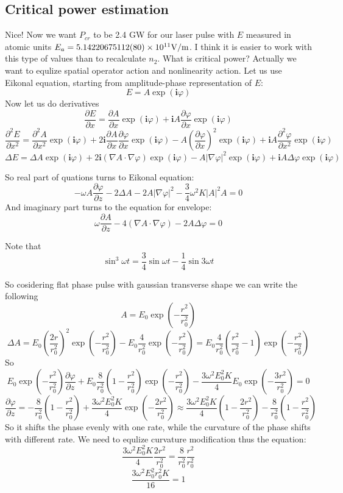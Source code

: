 \documentclass{article}
\newcommand{\dd}{\partial}
\newcommand{\ff}{\frac}
\newcommand{\ci}{\mathbf{i}}
\begin{document}
\subsection{Critical power estimation}
Nice! Now we want $P_{cr}$ to be 2.4 GW for our laser pulse with $E$ measured in atomic units $E_a = 5.14220675112(80) \times 10^{11} \text V / \text m$. I think it is easier to work with this type of values than to recalculate $n_2$.
What is critical power? Actually we want to equlize spatial operator action and nonlinearity action.
Let us use Eikonal equation, starting from amplitude-phase representation of $E$:
\[ E = A \exp (\ci \varphi) \]
Now let us do derivatives
\[ \ff{\dd E} {\dd x} = \ff{\dd A}{\dd x} \exp (\ci \varphi) + \ci A \ff{\dd \varphi}{\dd x} \exp (\ci \varphi) \]
\[ \ff{\dd^2 E} {\dd x^2} = \ff{\dd^2 A}{\dd x^2} \exp (\ci \varphi) + 2 \ci \ff{\dd A}{\dd x} \ff{\dd \varphi}{\dd x} \exp (\ci \varphi) - A \left(\ff{\dd \varphi}{\dd x}\right)^2 \exp (\ci \varphi) + \ci A \ff{\dd^2 \varphi}{\dd x^2} \exp (\ci \varphi) \]
\[ \Delta E = \Delta A \exp (\ci \varphi) + 2 \ci (\nabla A \cdot \nabla \varphi) \exp (\ci \varphi) - A |\nabla \varphi|^2 \exp (\ci \varphi) + \ci A \Delta \varphi \exp (\ci \varphi) \]

So real part of quations turns to Eikonal equation:
\begin{equation}
\label{Eikonal}
 - \omega A \ff{\dd \varphi}{\dd z} - 2 \Delta A - 2 A |\nabla \varphi|^2 - \ff{3}{4} \omega^2 K |A|
^2 A = 0
\end{equation}
And imaginary part turns to the equation for envelope:
\[ \omega \ff{\dd A}{\dd z} - 4  (\nabla A \cdot \nabla \varphi) - 2 A \Delta \varphi = 0 \]

Note that
\[ \sin^3\omega t = \ff{3}{4} \sin \omega t - \ff{1}{4} \sin 3\omega t \]

So cosidering flat phase pulse with gaussian transverse shape we can write the following
\[ A = E_0 \exp\left(-\ff{r^2}{r_0^2}\right) \]
\[ \Delta A = E_0 \left(\ff{2 r}{r_0^2}\right)^2 \exp\left(-\ff{r^2}{r_0^2}\right) - E_0 \ff{4}{r_0^2} \exp\left(-\ff{r^2}{r_0^2}\right) = E_0 \ff{4}{r_0^2} \left( \ff{ r^2}{r_0^2}-1\right) \exp\left(-\ff{r^2}{r_0^2}\right) \]
So
\[ E_0 \exp\left(-\ff{r^2}{r_0^2}\right) \ff{\dd \varphi}{\dd z} +  E_0 \ff{8}{r_0^2} \left(1 - \ff{r^2}{r_0^2}\right) \exp\left(-\ff{r^2}{r_0^2}\right) - \ff{3\omega^2 E_0^2K}{4} E_0 \exp\left(-\ff{3 r^2}{r_0^2}\right) = 0 \]
\[ \ff{\dd \varphi}{\dd z} = - \ff{8}{r_0^2} \left(1 - \ff{r^2}{r_0^2}\right) + \ff{3\omega^2 E_0^2K}{4} \exp\left(-\ff{2 r^2}{r_0^2}\right) \approx \ff{3\omega^2 E_0^2K}{4} \left(1-\ff{2 r^2}{r_0^2}\right) - \ff{8}{r_0^2} \left(1 - \ff{r^2}{r_0^2}\right) \]
So it shifts the phase evenly with one rate, while the curvature of the phase shifts with different rate. We need to equlize curvature modification thus the equation:
\[ \ff{3\omega^2 E_0^2K}{4} \ff{2 r^2}{r_0^2} = \ff{8}{r_0^2} \ff{r^2}{r_0^2} \]
\[ \ff{3\omega^2 E_0^2 r_0^2 K}{16} = 1 \]
\end{document}

